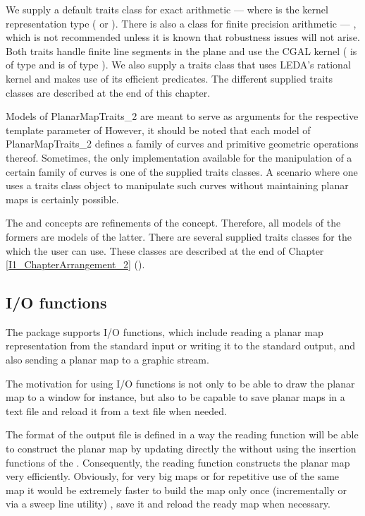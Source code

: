 We supply a default traits class for exact arithmetic ---
where  is the kernel representation type
( or ).  There is also a class
for finite precision arithmetic --- ,
which is not recommended unless it is known that robustness issues will not
arise. 
Both traits handle
finite line segments in the plane
and use the CGAL kernel ( is of type 
 and  is of type
).
We also supply a traits class that uses LEDA's rational kernel and makes use
of its efficient predicates. The different supplied traits classes are described at the end of this chapter.

Models of PlanarMapTraits\_2 are meant to serve as arguments for the respective
template parameter of \ccRefName\. However, it should be noted that
each model of PlanarMapTraits\_2 defines a family of curves and
primitive geometric operations thereof. Sometimes, the only
implementation available for the manipulation of a certain family of
curves is one of the supplied traits classes. A scenario where one
uses a traits class object to manipulate such curves without
maintaining planar maps is certainly possible.

The  and  
concepts are refinements of the  concept.
Therefore, all models of the formers are models of the latter. 
There are several supplied traits classes for the  which the user can use. 
These classes are described at the end of Chapter \ref{I1_ChapterArrangement_2}
().

\subsection*{I/O functions}
The  package supports I/O functions, which include reading a planar map representation from 
the standard input or writing it to the standard output, 
and also sending a planar map to a graphic stream.

The motivation for using I/O functions is not only to be able to draw 
the planar map to a window for instance, 
but also to be capable to save planar maps in a text file
and reload it from a text file when needed.

The format of the output file is defined in a way the reading function
will be able to construct the planar map by updating directly the
 without using the insertion functions of the .  Consequently, the reading function constructs the planar map
very efficiently. Obviously, for very big maps or for repetitive use
of the same map it would be extremely faster to build the map only once 
(incrementally or via a sweep line utility)
, save it and reload the ready map when necessary.

